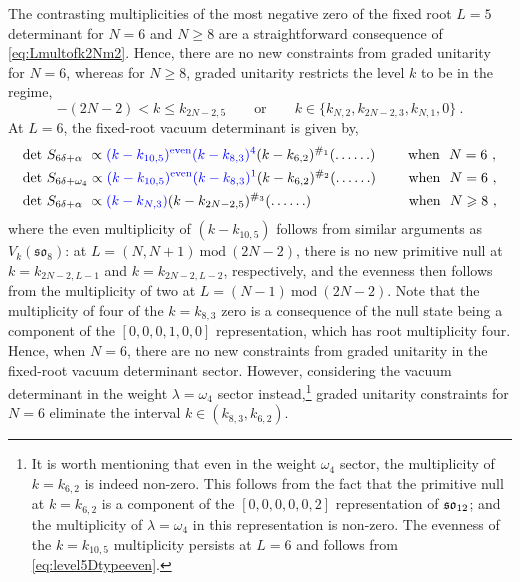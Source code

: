 The contrasting multiplicities of the most negative zero of the fixed root $L = 5$ determinant for $N = 6$ and $N \geqslant 8$ are a straightforward consequence of \eqref{eq:Lmultofk2Nm2}. Hence, there are no new constraints from graded unitarity for $N = 6$, whereas for $N \geqslant 8$, graded unitarity restricts the level $k$ to be in the regime, 
\begin{equation}
    -(2N-2) < k \leqslant k_{2N-2,5} \qquad \text{or} \qquad k \in \{k_{N,2}, k_{2N-2,3}, k_{N,1}, 0\}~. 
\end{equation}
At $L=6$, the fixed-root vacuum determinant is given by,
\begin{equation} \label{eq:Lvl6soeven}
\begin{split}
    &\text{det}~S_{6\delta + \alpha} \ \propto \textcolor{blue}{(k - k_{10,5})^{\mathrm{even}}(k - k_{8,3})^4}(k-k_{6,2})^{\#_1} (\ldots \ldots) \qquad \ \text{when} \ \ N = 6~, \\
    &\text{det}~S_{6\delta + \omega_4} \propto \textcolor{blue}{(k - k_{10,5})^{\mathrm{even}}(k - k_{8,3})^1}(k-k_{6,2})^{\#_2} (\ldots \ldots) \qquad \ \text{when} \ \ N = 6~, \\
    &\text{det}~S_{6\delta + \alpha} \ \propto \textcolor{blue}{(k - k_{N,3})}(k-k_{2N-2,5})^{\#_3} (\ldots \ldots) \qquad \qquad \qquad \ \ \ \text{when} \ \ N \geqslant 8~,   
\end{split}
\end{equation}
where the even multiplicity of $(k-k_{10,5})$ follows from similar arguments as $V_k(\mathfrak{so}_8)$: at $L = (N,N+1)~\mathrm{mod}~(2N-2)$, there is no new primitive null at $k = k_{2N-2,L-1}$ and $k = k_{2N-2,L-2}$, respectively, and the evenness then follows from the multiplicity of two at $L = (N-1)~\mathrm{mod}~(2N-2)$. Note that the multiplicity of four of the $k = k_{8,3}$ zero is a consequence of the null state being a component of the $[0,0,0,1,0,0]$ representation, which has root multiplicity four. Hence, when $N = 6$, there are no new constraints from graded unitarity in the fixed-root vacuum determinant sector. However, considering the vacuum determinant in the weight $\lambda = \omega_4$ sector instead,\footnote{It is worth mentioning that even in the weight $\omega_4$ sector, the multiplicity of $k=k_{6,2}$ is indeed non-zero. This follows from the fact that the primitive null at $k = k_{6,2}$ is a component of the $[0,0,0,0,0,2]$ representation of $\mathfrak{so}_{12}$; and the multiplicity of $\lambda = \omega_4$ in this representation is non-zero. The evenness of the $k = k_{10,5}$ multiplicity persists at $L = 6$ and follows from \eqref{eq:level5Dtypeeven}.} graded unitarity constraints for $N = 6$ eliminate the interval $k \in (k_{8,3}, k_{6,2})$.  

